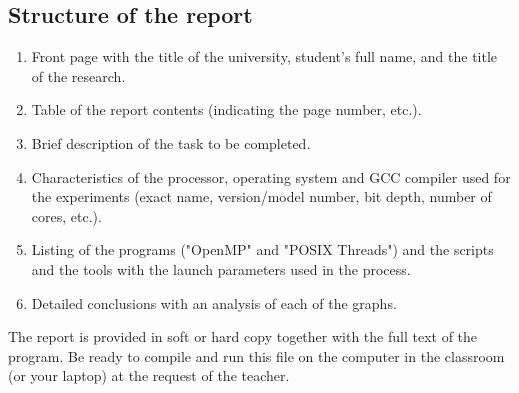 { %
	\subsection{Structure of the report}
	\begin{enumerate}
		\item Front page with the title of the university, student's full name, and the title of the research.
		\item Table of the report contents (indicating the page number, etc.).
		\item Brief description of the task to be completed.
		\item Characteristics of the processor, operating system and GCC compiler used for the experiments (exact name, version/model number, bit depth, number of cores, etc.).
		\item Listing of the programs ("OpenMP" and "POSIX Threads") and the scripts and the tools with the launch parameters used in the process.
		\item Detailed conclusions with an analysis of each of the graphs.
	\end{enumerate}
	\par The report is provided in soft or hard copy together with the full text of the program. Be ready to compile and run this file on the computer in the classroom (or your laptop) at the request of the teacher.
	\par
}